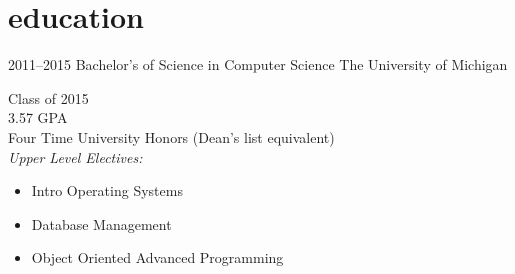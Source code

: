 \section{education}

\begin{entrylist}
\entry
{2011--2015}
{Bachelor's of Science in Computer Science}
{The University of Michigan}
{Class of 2015 \\
	3.57 GPA \\
	Four Time University Honors (Dean's list equivalent) \\
	\emph{Upper Level Electives:}
	\begin{itemize}
		\item Intro Operating Systems
		\item Database Management
		\item Object Oriented Advanced Programming
	\end{itemize}
}

\end{entrylist}
